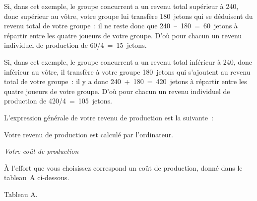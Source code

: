 \begin{Article}
\begin{refsection}[Lebourges]
\begin{appendices}
Si, dans cet exemple, le groupe concurrent a un revenu total supérieur à
240, donc supérieur au vôtre, votre groupe lui transfère 180~jetons qui
se déduisent du revenu total de votre groupe~: il ne reste donc que
240~--~180~=~60~jetons à répartir entre les quatre joueurs de votre
groupe. D'où pour chacun un revenu individuel de production de
60/4~=~15~jetons.

Si, dans cet exemple, le groupe concurrent a un revenu total inférieur à
240, donc inférieur au vôtre, il transfère à votre groupe 180~jetons qui
s'ajoutent au revenu total de votre groupe~: il y a donc
240~+~180~=~420~jetons à répartir entre les quatre joueurs de votre
groupe. D'où pour chacun un revenu individuel de production de
420/4~=~105~jetons.

L'expression générale de votre revenu de production est la suivante~:

\begin{center}
\noindent{}
\end{center}


\vspace{.2cm}
Votre revenu de production est calculé par l'ordinateur.

\vspace{.3cm}
\emph{Votre coût de production}

\vspace{.2cm}
À l'effort que vous choisissez correspond un coût de production, donné
dans le tableau~A ci-dessous.

\vspace{0,2cm}
{\centering Tableau A.\par}


\end{appendices}
\end{refsection}
\end{Article}
